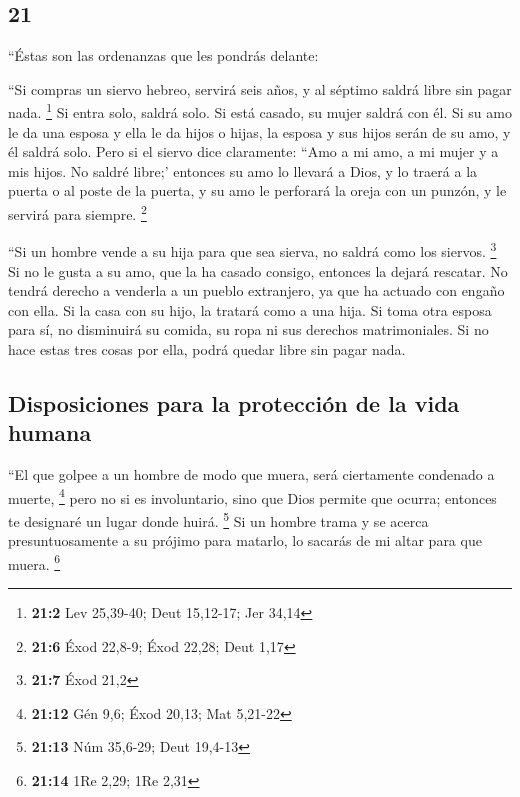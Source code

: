 \begin{paracol}{2}
\hypertarget{section-40}{%
\section{21}\label{section-40}}

 ``Éstas son las ordenanzas que les pondrás delante:

 ``Si compras un siervo hebreo, servirá seis años, y al
séptimo saldrá libre sin pagar nada. \footnote{\textbf{21:2} Lev
  25,39-40; Deut 15,12-17; Jer 34,14}  Si entra solo,
saldrá solo. Si está casado, su mujer saldrá con él.  Si
su amo le da una esposa y ella le da hijos o hijas, la esposa y sus
hijos serán de su amo, y él saldrá solo.  Pero si el
siervo dice claramente: ``Amo a mi amo, a mi mujer y a mis hijos. No
saldré libre;'  entonces su amo lo llevará a Dios, y lo
traerá a la puerta o al poste de la puerta, y su amo le perforará la
oreja con un punzón, y le servirá para siempre. \footnote{\textbf{21:6}
  Éxod 22,8-9; Éxod 22,28; Deut 1,17}

 ``Si un hombre vende a su hija para que sea sierva, no
saldrá como los siervos. \footnote{\textbf{21:7} Éxod 21,2}
 Si no le gusta a su amo, que la ha casado consigo,
entonces la dejará rescatar. No tendrá derecho a venderla a un pueblo
extranjero, ya que ha actuado con engaño con ella.  Si la
casa con su hijo, la tratará como a una hija.  Si toma
otra esposa para sí, no disminuirá su comida, su ropa ni sus derechos
matrimoniales.  Si no hace estas tres cosas por ella,
podrá quedar libre sin pagar nada.

\hypertarget{disposiciones-para-la-protecciuxf3n-de-la-vida-humana}{%
\subsection{Disposiciones para la protección de la vida
humana}\label{disposiciones-para-la-protecciuxf3n-de-la-vida-humana}}

 ``El que golpee a un hombre de modo que muera, será
ciertamente condenado a muerte, \footnote{\textbf{21:12} Gén 9,6; Éxod
  20,13; Mat 5,21-22}  pero no si es involuntario, sino
que Dios permite que ocurra; entonces te designaré un lugar donde huirá.
\footnote{\textbf{21:13} Núm 35,6-29; Deut 19,4-13}  Si
un hombre trama y se acerca presuntuosamente a su prójimo para matarlo,
lo sacarás de mi altar para que muera. \footnote{\textbf{21:14} 1Re
  2,29; 1Re 2,31}


\end{paracol}
